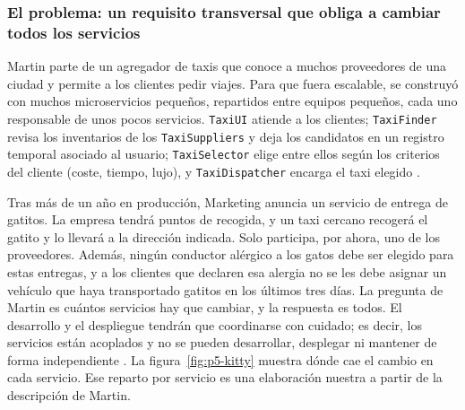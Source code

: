 \subsubsection{El problema: un requisito transversal que obliga a cambiar todos los servicios}

Martin parte de un agregador de taxis que conoce a muchos proveedores de una ciudad y permite a los
clientes pedir viajes. Para que fuera escalable, se construyó con muchos microservicios pequeños,
repartidos entre equipos pequeños, cada uno responsable de unos pocos servicios. \texttt{TaxiUI}
atiende a los clientes;
\texttt{TaxiFinder} revisa los inventarios de los \texttt{TaxiSuppliers} y deja los candidatos en un
registro temporal asociado al usuario; \texttt{TaxiSelector} elige entre ellos según los criterios
del cliente (coste, tiempo, lujo), y \texttt{TaxiDispatcher} encarga el taxi elegido
\parencite[p.~242]{martin2017clean}.

Tras más de un año en producción, Marketing anuncia un servicio de entrega de gatitos. La empresa
tendrá puntos de recogida, y un taxi cercano recogerá el gatito y lo llevará a la dirección indicada.
Solo participa, por ahora, uno de los proveedores. Además, ningún conductor alérgico a los gatos
debe ser elegido para estas entregas, y a los clientes que declaren esa alergia no se les debe
asignar un vehículo que haya transportado gatitos en los últimos tres días. La pregunta de Martin es
cuántos servicios hay que cambiar, y la respuesta es todos. El desarrollo y el despliegue tendrán
que coordinarse con cuidado; es decir, los servicios están acoplados y no se pueden desarrollar,
desplegar ni mantener de forma independiente \parencite[p.~243]{martin2017clean}. La
figura~\ref{fig:p5-kitty} muestra dónde cae el cambio en cada servicio. Ese reparto por servicio es
una elaboración nuestra a partir de la descripción de Martin.

